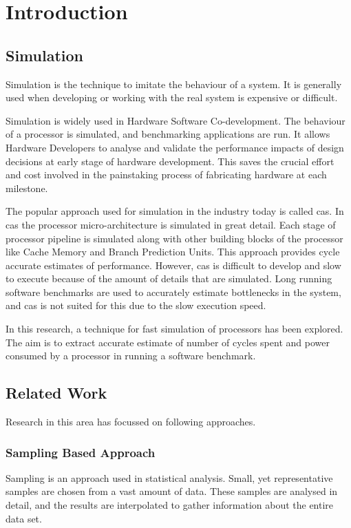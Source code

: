 \chapter{Introduction}\label{chapter:introduction}

\section{Simulation}

Simulation is the technique to imitate the behaviour of a system. It is generally used when developing or working with the real system is expensive or difficult. 

Simulation is widely used in Hardware Software Co-development. The behaviour of a processor is simulated, and benchmarking applications are run. It allows Hardware Developers to analyse and validate the performance impacts of design decisions at early stage of hardware development. This saves the crucial effort and cost involved in the painstaking process of fabricating hardware at each milestone.

The popular approach used for simulation in the industry today is called \gls{cas}. In \gls{cas} the processor micro-architecture is simulated in great detail. Each stage of processor pipeline is simulated along with other building blocks of the processor like Cache Memory and Branch Prediction Units. This approach provides cycle accurate estimates of performance. However, \gls{cas} is difficult to develop and slow to execute because of the amount of details that are simulated. Long running software benchmarks are used to accurately estimate bottlenecks in the system, and \gls{cas} is not suited for this due to the slow execution speed.

In this research, a technique for fast simulation of processors has been explored. The aim is to extract accurate estimate of number of cycles spent and power consumed by a processor in running a software benchmark. 

\section{Related Work}
Research in this area has focussed on following approaches.

\subsection{Sampling Based Approach}
Sampling is an approach used in statistical analysis. Small, yet representative samples are chosen from a vast amount of data. These samples are analysed in detail, and the results are interpolated to gather information about the entire data set.

